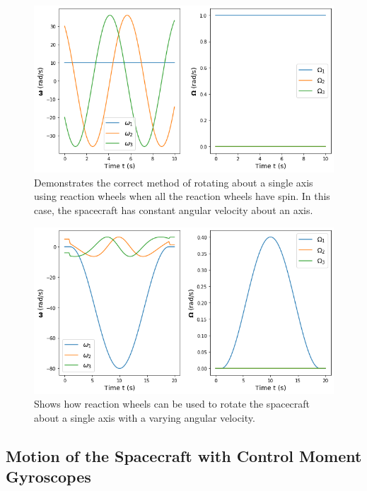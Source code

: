 \documentclass[12]{article}
\begin{document}
\begin{multicols*}{2}
\begin{figure}[H]
\centering
\includegraphics[width=\linewidth]{fig/reaction_smart_constant.png}
\vspace{-0.3cm}
\caption{\label{fig:reaction_smart_constant}Demonstrates the correct method of rotating about a single axis using reaction wheels when all the reaction wheels have spin. In this case, the spacecraft has constant angular velocity about an axis.}
\end{figure}

\begin{figure}[H]
\centering
\includegraphics[width=\linewidth]{fig/reaction_smart_variable.png}
\vspace{-0.3cm}
\caption{\label{fig:reaction_smart_variable}Shows how reaction wheels can be used to rotate the spacecraft about a single axis with a varying angular velocity.}
\end{figure}

\subsection{Motion of the Spacecraft with Control Moment Gyroscopes}


\end{multicols*}
\end{document}
